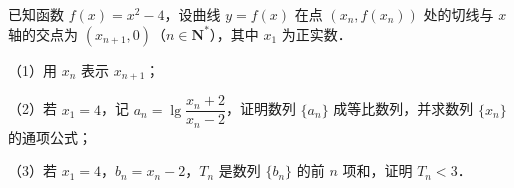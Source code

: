 \begin{question}
已知函数 $f(x)=x^2-4$，设曲线 $y=f(x)$ 在点 $(x_n,f(x_n))$ 处的切线与 $x$ 轴的交点为 $(x_{n+1},0)$（$n\in\mathbf N^*$），其中 $x_1$ 为正实数．

（1）用 $x_n$ 表示 $x_{n+1}$；

（2）若 $x_1=4$，记 $a_n=\lg\dfrac{x_n+2}{x_n-2}$，证明数列 $\{a_n\}$ 成等比数列，并求数列 $\{x_n\}$ 的通项公式；

（3）若 $x_1=4$，$b_n=x_n-2$，$T_n$ 是数列 $\{b_n\}$ 的前 $n$ 项和，证明 $T_n<3$．

\end{question}